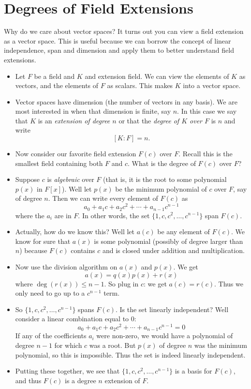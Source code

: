 \documentclass[12pt]{article}
\theoremstyle{plain}
\theoremstyle{definition}
\theoremstyle{remark}
\newcommand{\todayis}[1]{\clearpage{\rhead{\footnotesize #1}}}
\begin{document}
\todayis{Monday, January 28} 
\section*{Degrees of Field Extensions}

Why do we care about vector spaces?  It turns out you can view a field extension as a vector space.  This is useful because we can borrow the concept of linear independence, span and dimension and apply them to better understand field extensions.

\begin{itemize}
\item Let $F$ be a field and $K$ and extension field.  We can view the elements of $K$ as vectors, and the elements of $F$ as scalars.  This makes $K$ into a vector space.
\item Vector spaces have dimension (the number of vectors in any basis).  We are most interested in when that dimension is finite, say $n$.  In this case we say that $K$ is an {\em extension of degree $n$} or that the {\em degree of $K$ over $F$} is $n$ and write
\[[K:F]=n.\]
\item Now consider our favorite field extension $F(c)$ over $F$.  Recall this is the smallest field containing both $F$ and $c$.  What is the degree of $F(c)$ over $F$?
\item Suppose $c$ is {\em algebraic} over $F$ (that is, it is the root to some polynomial $p(x)$ in $F[x]$).  Well let $p(x)$ be the minimum polynomial of $c$ over $F$, say of degree $n$.  Then we can write every element of $F(c)$ as
\[a_0 + a_1c + a_2c^2 + \cdots +a_{n-1}c^{n-1}\]
where the $a_i$ are in $F$.  In other words, the set $\{1, c, c^2,\ldots, c^{n-1}\}$ span $F(c)$.
\item Actually, how do we know this?  Well let $a(c)$ be any element of $F(c)$.  We know for sure that $a(x)$ is some polynomial (possibly of degree larger than $n$) because $F(c)$ contains $c$ and is closed under addition and multiplication. 
\item Now use the division algorithm on $a(x)$ and $p(x)$.  We get
\[a(x) = q(x)p(x) + r(x)\]
where $\deg(r(x)) \le n-1$.  So plug in $c$: we get $a(c) = r(c)$.  Thus we only need to go up to a $c^{n-1}$ term.
\item So $\{1, c, c^2, \ldots, c^{n-1}\}$ spans $F(c)$.  Is the set linearly independent?  Well consider a linear combination equal to 0:
\[a_0 + a_1c + a_2c^2 + \cdots + a_{n-1}c^{n-1} = 0\]
If any of the coefficients $a_i$ were non-zero, we would have a polynomial of degree $n-1$ for which $c$ was a root.  But $p(x)$ of degree $n$ was the minimum polynomial, so this is impossible.  Thus the set is indeed linearly independent.
\item Putting these together, we see that $\{1, c, c^2, \ldots, c^{n-1}\} $ is a basis for $F(c)$, and thus $F(c)$ is a degree $n$ extension of $F$.


\end{itemize}
\end{document}
